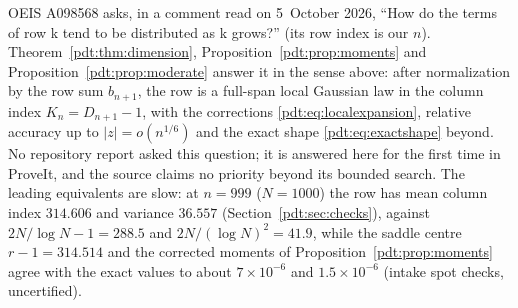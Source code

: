 \begin{writenote}
OEIS A098568 asks, in a comment read on 5~October 2026, ``How do the terms
of row k tend to be distributed as k grows?'' (its row index is our $n$).
Theorem~\ref{pdt:thm:dimension}, Proposition~\ref{pdt:prop:moments} and
Proposition~\ref{pdt:prop:moderate} answer it in the sense above: after
normalization by the row sum $b_{n+1}$, the row is a full-span local
Gaussian law in the column index $K_n=D_{n+1}-1$, with the corrections
\eqref{pdt:eq:localexpansion}, relative accuracy up to $|z|=o(n^{1/6})$ and
the exact shape \eqref{pdt:eq:exactshape} beyond. No repository report
asked this question; it is answered here for the first time in ProveIt, and
the source claims no priority beyond its bounded search. The leading
equivalents are slow: at $n=999$ ($N=1000$) the row has mean column index
$314.606$ and variance $36.557$ (Section~\ref{pdt:sec:checks}), against
$2N/\log N-1=288.5$ and $2N/(\log N)^2=41.9$, while the saddle centre
$r-1=314.514$ and the corrected moments of
Proposition~\ref{pdt:prop:moments} agree with the exact values to about
$7\times10^{-6}$ and $1.5\times10^{-6}$ (intake spot checks, uncertified).
\end{writenote}
